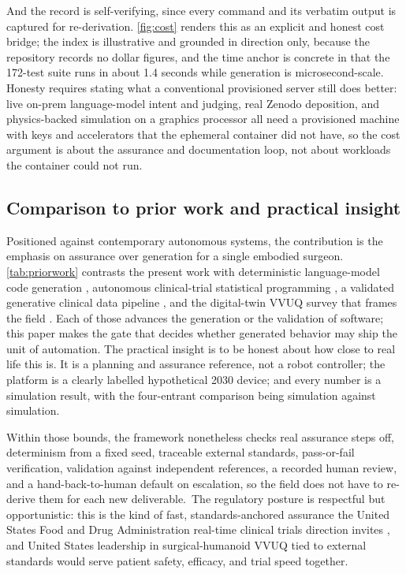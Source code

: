 And the
record is self-verifying, since every command and its verbatim output is captured
for re-derivation. \autoref{fig:cost} renders this as an explicit and honest cost
bridge; the index is illustrative and grounded in direction only, because the
repository records no dollar figures, and the time anchor is concrete in that the
172-test suite runs in about 1.4 seconds while generation is microsecond-scale.
Honesty requires stating what a conventional provisioned server still does
better: live on-prem language-model intent and judging, real Zenodo deposition,
and physics-backed simulation on a graphics processor all need a provisioned
machine with keys and accelerators that the ephemeral container did not have, so
the cost argument is about the assurance and documentation loop, not about
workloads the container could not run.

\subsection{Comparison to prior work and practical insight}

Positioned against contemporary autonomous systems, the contribution is the
emphasis on assurance over generation for a single embodied surgeon.
\autoref{tab:priorwork} contrasts the present work with deterministic
language-model code generation \cite{trooskens2026compiled}, autonomous
clinical-trial statistical programming \cite{yan2026clinagent}, a validated
generative clinical data pipeline \cite{carlisle2026pipeline}, and the
digital-twin VVUQ survey that frames the field \cite{sel2025vvuq}. Each of those
advances the generation or the validation of software; this paper makes the gate
that decides whether generated behavior may ship the unit of automation. The
practical insight is to be honest about how close to real life this is. It is a
planning and assurance reference, not a robot controller; the platform is a
clearly labelled hypothetical 2030 device; and every number is a simulation
result, with the four-entrant comparison being simulation against simulation.


Within those bounds, the framework nonetheless checks real assurance steps off,
determinism from a fixed seed, traceable external standards, pass-or-fail
verification, validation against independent references, a recorded human review,
and a hand-back-to-human default on escalation, so the field does not have to
re-derive them for each new deliverable.\ The regulatory posture is respectful but
opportunistic: this is the kind of fast, standards-anchored assurance the United
States Food and Drug Administration real-time clinical trials direction invites
\cite{fda2026realtime}, and United States leadership in surgical-humanoid VVUQ
tied to external standards would serve patient safety, efficacy, and trial speed
together.

